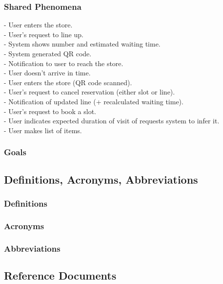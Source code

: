 \documentclass{article}
\begin{document}
\subsubsection{Shared Phenomena}
\noindent\medskip
[SP1] - User enters the store.\\
\noindent\medskip
[SP2] - User's request to line up.\\
\noindent\medskip
[SP3] - System shows number and estimated waiting time.\\
\noindent\medskip
[SP4] - System generated QR code.\\
\noindent\medskip
[SP5] - Notification to user to reach the store.\\
\noindent\medskip
[SP6] - User doesn't arrive in time.\\
\noindent\medskip
[SP7] - User enters the store (QR code scanned).\\
\noindent\medskip
[SP8] - User's request to cancel reservation (either slot or line).\\
\noindent\medskip
[SP9] - Notification of updated line (+ recalculated waiting time).\\
\noindent\medskip
[SP10] - User's request to book a slot.\\
\noindent\medskip
[SP11] - User indicates expected duration of visit of requests system to infer it.\\
\noindent\medskip
[SP12] - User makes list of items.\\
\subsubsection{Goals}

\subsection{Definitions, Acronyms, Abbreviations}
\subsubsection{Definitions}
\subsubsection{Acronyms}
\subsubsection{Abbreviations}

\subsection{Reference Documents}
\end{document}
